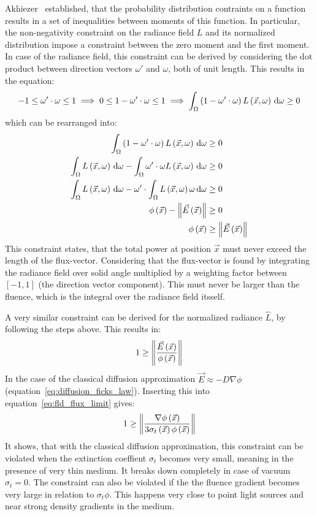 Akhiezer~\cite{Akhiezer65} established, that the probability distribution contraints on a function results in a set of inequalities between moments of this function. In particular, the non-negativity constraint on the radiance field $L$ and its normalized distribution impose a constraint between the zero moment and the first moment. In case of the radiance field, this constraint can be derived by considering the dot product between direction vectors $\omega'$ and $\omega$, both of unit length. This results in the equation:
\begin{align*}
-1 \le \omega'\cdot\omega \le 1
\implies
0 \le 1 - \omega'\cdot\omega \le 1
\implies
\int_{\Omega}{\left(1-\omega'\cdot\omega\right)L\left(\vec{x}, \omega\right)\,\mathrm{d}\omega}\ge 0
\end{align*}
which can be rearranged into:
\begin{align*}
\int_{\Omega}{\left(1-\omega'\cdot\omega\right)L\left(\vec{x}, \omega\right)\,\mathrm{d}\omega} &\ge 0
\\
\int_{\Omega}{L\left(\vec{x}, \omega\right)\,\mathrm{d}\omega}
-\int_{\Omega}{\omega'\cdot\omega L\left(\vec{x}, \omega\right)\,\mathrm{d}\omega}
&\ge 0
\\
\int_{\Omega}{L\left(\vec{x}, \omega\right)\,\mathrm{d}\omega}
-\omega'\cdot\int_{\Omega}{L\left(\vec{x}, \omega\right)\omega\,\mathrm{d}\omega}
&\ge 0
\\
\phi\left(\vec{x}\right)
-\left\lVert\vec{E}\left(\vec{x}\right)\right\rVert
&\ge 0
\\
\phi\left(\vec{x}\right)
&\ge \left\lVert\vec{E}\left(\vec{x}\right)\right\rVert
\end{align*}
This constraint states, that the total power at position $\vec{x}$ must never exceed the length of the flux-vector. Considering that the flux-vector is found by integrating the radiance field over solid angle multiplied by a weighting factor between $\left[-1, 1\right]$ (the direction vector component). This must never be larger than the fluence, which is the integral over the radiance field itsself.

A very similar constraint can be derived for the normalized radiance $\widehat{L}$, by following the steps above. This results in:
\begin{align}
\label{eq:fld_flux_limit}
1
\ge
\left\lVert
\frac{\vec{E}\left(\vec{x}\right)}{\phi\left(\vec{x}\right)}
\right\rVert
\end{align}
In the case of the classical diffusion approximation $\vec{E}\approx-D\nabla\phi$ (equation~\ref{eq:diffusion_ficks_law}). Inserting this into equation~\ref{eq:fld_flux_limit} gives:
\begin{align}
\label{eq:fld_flux_limit}
1
\ge
\left\lVert
\frac{\nabla\phi\left(\vec{x}\right)}{3\sigma_t\left(\vec{x}\right)\phi\left(\vec{x}\right)}
\right\rVert
\end{align}
It shows, that with the classical diffusion approximation, this constraint can be violated when the extinction coeffient $\sigma_t$ becomes very small, meaning in the presence of very thin medium. It breaks down completely in case of vacuum $\sigma_t=0$. The constraint can also be violated if the the fluence gradient becomes very large in relation to $\sigma_t\phi$. This happens very close to point light sources and near strong density gradients in the medium.

